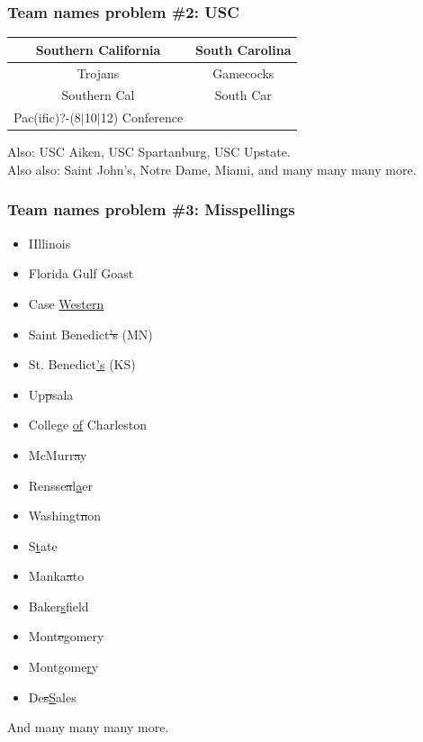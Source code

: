 \documentclass{beamer}
\begin{document}
\begin{frame}
\frametitle{Team names problem \#2: USC}
\begin{center}
\begin{tabular}{c @{\qquad} c}\toprule
Southern California & South Carolina \\\midrule
Trojans & Gamecocks \\
Southern Cal & South Car \\
Pac(ific)?-(8$|$10$|$12) Conference \\\bottomrule
\end{tabular}
\end{center}
Also: USC Aiken, USC Spartanburg, USC Upstate.\\\bigskip
Also also: Saint John's, Notre Dame, Miami, and many many many more.
\end{frame}

\begin{frame}
\frametitle{Team names problem \#3: Misspellings}
\begin{multicols}{2}
\begin{itemize}
\item IIllinois
\item Florida Gulf Goast
\item Case \underline{Western}
\item Saint Benedict\sout{'s} (MN)
\item St. Benedict\underline{'s} (KS)
\item Up\sout psala
\item College \underline{of} Charleston
\item McMurr\sout ay
\item Rensse\sout al\underline aer
\item Washingt\sout non
\item S\underline tate
\item Manka\sout ato
\item Baker\underline sfield
\item Mont\sout egomery
\item Montgome\underline ry
\item De\sout s\underline Sales
\end{itemize}
\end{multicols}
And many many many more.
\end{frame}
\end{document}
